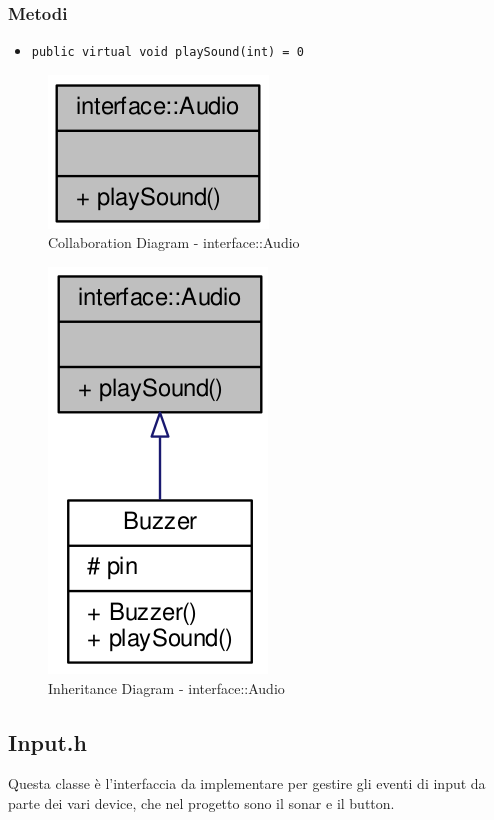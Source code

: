 \subsubsection{Metodi}
\begin{itemize}
	\item \texttt{public virtual void playSound(int) = 0}
\end{itemize}
\begin{figure}[!ht]
	\centering
	\includegraphics[scale=.35]{img/UML/CollaborationDiagram/interface/interface::Audio.png}
	\caption{Collaboration Diagram - interface::Audio}
\end{figure}
\begin{figure}[!ht]
	\centering
	\includegraphics[scale=.35]{img/UML/InheritanceDiagram/interface/interface::Audio.png}
	\caption{Inheritance Diagram - interface::Audio}
\end{figure}

\newpage
\subsection{Input.h}
Questa classe è l'interfaccia da implementare per gestire gli eventi di input da parte dei vari device, che nel progetto sono il sonar e il button.
